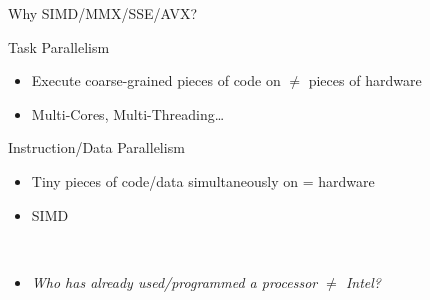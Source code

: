 \documentclass[presentation]{beamer}
\begin{document}
\begin{frame}[label={sec:org2b61602}]{Why SIMD/MMX/SSE/AVX?}
\begin{block}{Task Parallelism}
\begin{itemize}
\item Execute coarse-grained pieces of code on \(\neq\) pieces of hardware
\item Multi-Cores, \alert{Multi-Threading}\ldots{}
\end{itemize}
\pause
\end{block}
\begin{block}{Instruction/Data Parallelism}
\begin{itemize}
\item Tiny pieces of code/data simultaneously on = hardware
\item \alert{SIMD}
\end{itemize}
\pause
\end{block}

\begin{block}{ ~~}
\bigskip
\begin{itemize}
\item \emph{Who has already used/programmed a processor \(\neq\) Intel?}
\bigskip
\end{itemize}
\end{block}
\end{frame}
\end{document}
